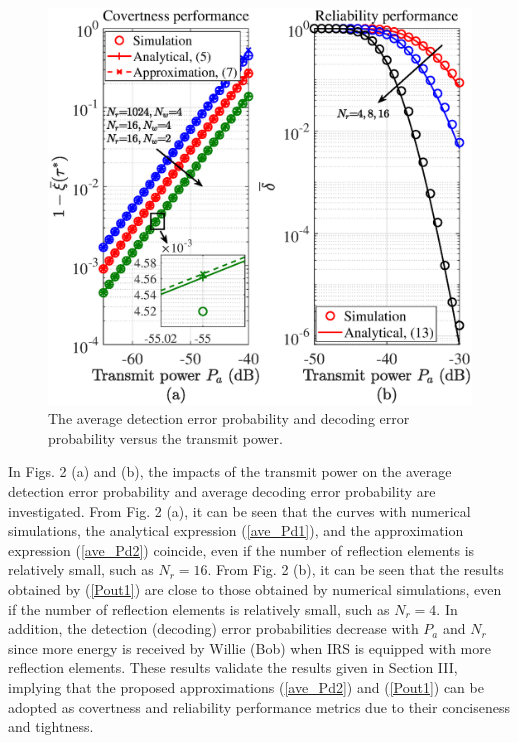 \documentclass[conference]{IEEEtran}
\begin{document}
\begin{figure}
	\centering
	\includegraphics[width=0.85\linewidth]{figure/fig2_re.eps}
	\caption{The average detection error probability and decoding error probability versus the transmit power.}
\end{figure}
In Figs. 2 (a) and (b), the impacts of the transmit power on the average detection error probability and average decoding error probability are investigated. From Fig. 2 (a), it can be seen that the curves with numerical simulations, the analytical expression (\ref{ave_Pd1}), and the approximation expression (\ref{ave_Pd2}) coincide, even if the number of reflection elements is relatively small, such as $N_r\!\!=\!\!16$. From Fig. 2 (b), it can be seen that the results obtained by (\ref{Pout1}) are close to those obtained by numerical simulations, even if the number of reflection elements is relatively small, such as $N_r=4$. In addition, the detection (decoding) error probabilities decrease with $P_a$ and $N_r$ since more energy is received by Willie (Bob) when IRS is equipped with more reflection elements. These results validate the results given in Section III, implying that the proposed approximations (\ref{ave_Pd2}) and (\ref{Pout1}) can be adopted as covertness and reliability performance metrics due to their conciseness and tightness.
\end{document}
